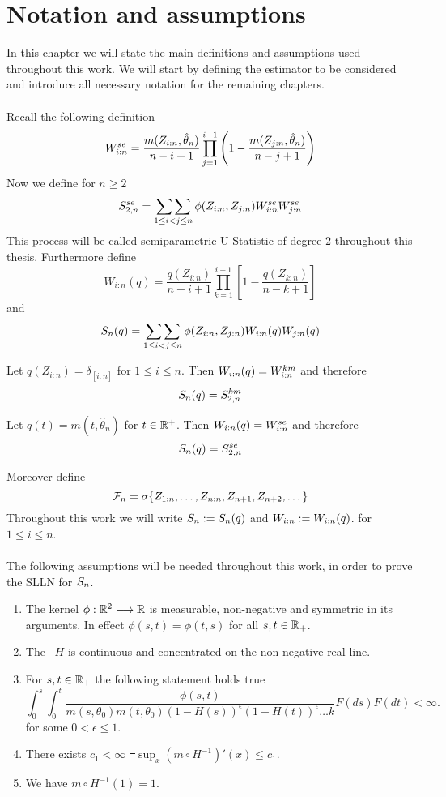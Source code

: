 \chapter{Notation and assumptions}
In this chapter we will state the main definitions and assumptions used throughout this work. We will start by defining the estimator to be considered and introduce all necessary notation for the remaining chapters.\\
\\
Recall the following definition
$$W_{i:n}^{se} = \frac{m(Z_{i:n}, \hat{\theta}_n)}{n-i+1} \prod\limits_{j=1}^{i-1}\left(1-\frac{m(Z_{j:n}, \hat{\theta}_n)}{n-j+1}\right)$$
%
Now we define for $n\geq2$
$$S_{2,n}^{se} = \mathop{\sum\sum}\limits_{1\leq i<j\leq n}\phi(Z_{i:n}, Z_{j:n})W_{i:n}^{se}W_{j:n}^{se}$$
This process will be called semiparametric U-Statistic of degree $2$ throughout this thesis.
%
Furthermore define
$$W_{i:n}(q) = \frac{q(Z_{i:n})}{n-i+1}\prod_{k=1}^{i-1}\left[1-\frac{q(Z_{k:n})}{n-k+1}\right]$$
and 
$$S_{n}(q) = \mathop{\sum\sum}\limits_{1\leq i<j\leq n}\phi(Z_{i:n}, Z_{j:n})W_{i:n}(q)W_{j:n}(q)$$
%
\begin{example}
	Let $q(Z_{i:n}) = \delta_{[i:n]}$ for $1\leq i\leq n$. Then $W_{i:n}(q) = W_{i:n}^{km}$ and therefore 
	$$S_n(q) = S_{2,n}^{km}$$
\end{example}
%
\begin{example}
	Let $q(t) = m(t, \hat\theta_n)$ for $t\in\mathbb{R}^+$. Then $W_{i:n}(q) = W_{i:n}^{se}$ and therefore 
	$$S_n(q) = S_{2,n}^{se}$$
\end{example}
%
\noindent Moreover define
$$\mathcal{F}_n = \sigma\{Z_{1:n}, \dots, Z_{n:n}, Z_{n+1}, Z_{n+2}, \dots\}$$
%
Throughout this work we will write $S_{n} := S_{n}(q)$ and $W_{i:n} := W_{i:n}(q)$.
for $1\leq i\leq n$.\\
\\
%
The following assumptions will be needed throughout this work, in order to prove the SLLN for $S_{n}$.
\begin{enumerate}[({A}1)]
	\item \label{ass:kernel_gen} The kernel $\phi: \mathbb{R}^2 \longrightarrow \mathbb{R}$ is measurable, non-negative and symmetric in its arguments. In effect $\phi(s,t) = \phi(t,s)$ for all $s,t \in \mathbb{R}_+$. 
	\item \label{ass:H_nonneg} The \df\ $H$ is continuous and concentrated on the non-negative real line.
	\item \label{ass:intgral_phi_q} For $s,t\in \mathbb{R}_+$ the following statement holds true
	$$\int_{0}^{s} \int_{0}^{t} \frac{\phi(s,t)}{m(s, \theta_0)m(t,\theta_0)(1-H(s))^\epsilon(1-H(t))^\epsilon…k} F(ds)F(dt) < \infty\textrm{.}$$
	for some $0<\epsilon\leq 1$.
	\item \label{ass:sup_mprime} There exists $c_1 < \infty$ \st\ $\sup_{x} (m\circ H^{-1})'(x) \leq c_1$. 
	\item \label{ass:m_H_one} We have $m\circ H^{-1}(1) = 1$.
\end{enumerate}
